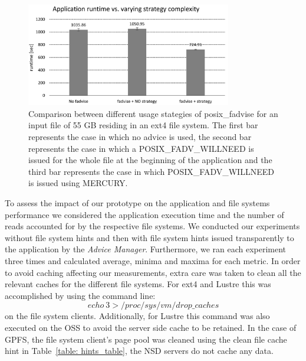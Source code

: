 \begin{figure}[!htb]
  \centering
  \includegraphics[width=0.8\textwidth]{chapters/chapter2/figures/SC2015/ROOT/separate_plots/test_cluster/test_fadvise_no_border}
  \caption{Comparison between different usage stategies of posix\_fadvise for an input file of 55 GB residing in an ext4 file system. The first bar represents the case in which no advice is used, the second bar represents the case in which a 
  POSIX\_FADV\_WILLNEED is issued for the whole file at the beginning of the application and the third bar represents the case in which POSIX\_FADV\_WILLNEED is issued using MERCURY.}
  \label{figure: fadvise_comparison}
\end{figure} 
 
To assess the impact of our prototype on the application and file systems performance we considered the application execution time and the number of reads accounted for by the respective file systems. We conducted our experiments without file system hints 
and then with file system hints issued transparently to the application by the \textit{Advice Manager}. Furthermore, we ran each experiment three times and calculated average, minima and maxima for each metric. In order to avoid caching affecting our 
measurements, extra care was taken to clean all the relevant caches for the different file systems. For ext4 and Lustre this was accomplished by using the command line: $$echo\ 3 > /proc/sys/vm/drop\_caches$$ on the file system clients. Additionally, 
for Lustre this command was also executed on the OSS to avoid the server side cache to be retained. In the case of GPFS, the file system client's page pool was cleaned using the clean file cache hint in Table~\ref{table: hints_table}, the NSD servers do 
not cache any data. 

